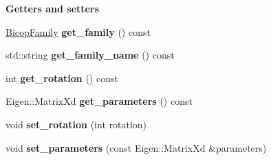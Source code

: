 \begin{Indent}{\bf Getters and setters}\par
\begin{DoxyCompactItemize}
\item 
\hyperlink{namespacevinecopulib_a42e95cc06d33896199caab0c11ad44f3}{Bicop\+Family} {\bfseries get\+\_\+family} () const \hypertarget{classvinecopulib_1_1_bicop_a68ab3556ee3bb3d02814fd978573bf3b}{}\label{classvinecopulib_1_1_bicop_a68ab3556ee3bb3d02814fd978573bf3b}

\item 
std\+::string {\bfseries get\+\_\+family\+\_\+name} () const \hypertarget{classvinecopulib_1_1_bicop_a4d4fbc0fdca17564c23f4814d5d2fbe7}{}\label{classvinecopulib_1_1_bicop_a4d4fbc0fdca17564c23f4814d5d2fbe7}

\item 
int {\bfseries get\+\_\+rotation} () const \hypertarget{classvinecopulib_1_1_bicop_ab8e52577a50fbfc57277f9240d8eac03}{}\label{classvinecopulib_1_1_bicop_ab8e52577a50fbfc57277f9240d8eac03}

\item 
Eigen\+::\+Matrix\+Xd {\bfseries get\+\_\+parameters} () const \hypertarget{classvinecopulib_1_1_bicop_a93ab0dd89826e50b209ea3760f251f2f}{}\label{classvinecopulib_1_1_bicop_a93ab0dd89826e50b209ea3760f251f2f}

\item 
void {\bfseries set\+\_\+rotation} (int rotation)\hypertarget{classvinecopulib_1_1_bicop_a4e359624560a089273b25dc74879bd16}{}\label{classvinecopulib_1_1_bicop_a4e359624560a089273b25dc74879bd16}

\item 
void {\bfseries set\+\_\+parameters} (const Eigen\+::\+Matrix\+Xd \&parameters)\hypertarget{classvinecopulib_1_1_bicop_ac8d1d4266b0fd7e2f971d0149f881ef9}{}\label{classvinecopulib_1_1_bicop_ac8d1d4266b0fd7e2f971d0149f881ef9}

\end{DoxyCompactItemize}
\end{Indent}
